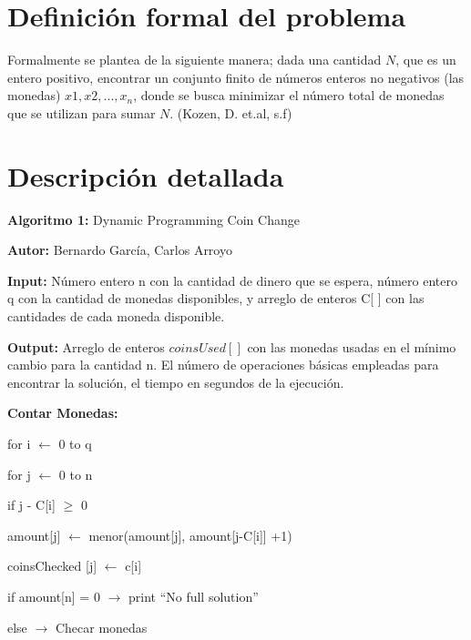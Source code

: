 \documentclass[12pt,letterpaper, titlepage, onecolumn]{article}
\begin{document}
\pagebreak	

\section{Definición formal del problema}
\par\indent Formalmente se plantea de la siguiente manera; dada una cantidad $N$, que es un entero 
positivo, encontrar un conjunto finito de números enteros no negativos (las monedas) 
${x1, x2, ..., x_n}$, donde se busca minimizar el número total de monedas que se utilizan 
para sumar $N$. (Kozen, D. et.al, s.f)

\section{Descripción detallada}
\textbf{Algoritmo 1:} Dynamic Programming Coin Change
\par\textbf{Autor:} Bernardo García, Carlos Arroyo
\par\textbf{Input:} Número entero n con la cantidad de dinero que se espera, número entero q con la cantidad de monedas disponibles, y arreglo de enteros C[ ] con las cantidades de cada moneda disponible. 
\par\textbf{Output:} Arreglo de enteros $coinsUsed[ ]$ con las monedas usadas en el mínimo cambio para la cantidad n.  El número de operaciones básicas empleadas para encontrar la solución, el tiempo en segundos de la ejecución.
\\
\par\textbf{Contar Monedas:}
		\par\indent for i $\leftarrow$ 0 to q
		\par\indent\indent for j $\leftarrow$ 0 to n
		\par\indent\indent\indent if j - C[i] $\ge$ 0
		\par\indent\indent\indent\indent amount[j] $\leftarrow$ menor(amount[j], amount[j-C[i]] +1)
		\par\indent\indent\indent\indent coinsChecked [j] $\leftarrow$ c[i]


		\par\indent if amount[n] = 0 $\rightarrow$  print “No full solution”
		\par\indent else $\rightarrow$ Checar monedas
	
\end{document}
